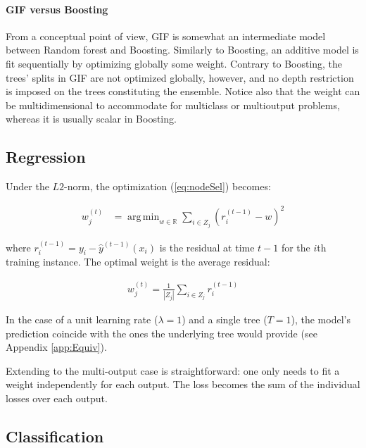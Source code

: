 \documentclass{article}
\DeclareMathOperator*{\argmin}{arg\,min}
\begin{document}
\paragraph{GIF versus Boosting}
From a conceptual point of view, GIF is somewhat an intermediate model 
between Random forest and Boosting. Similarly to Boosting, an additive model 
is fit sequentially by optimizing globally some weight. Contrary to 
Boosting, the trees' splits in GIF are not optimized globally, however, and no 
depth restriction is imposed on the trees constituting the ensemble. Notice 
also that the weight can be multidimensional to accommodate for multiclass or 
multioutput problems, whereas it is usually scalar in Boosting.


\subsection{Regression}
\label{subsec:regression}

Under the $L2$-norm, the optimization (\ref{eq:nodeSel}) becomes:

\vspace*{-\baselineskip}
\begin{align}\label{eq:L2min}
w_j^{(t)} &=  \argmin_{w \in \mathbb{R}} \sum_{i \in Z_j} \left(r_i^{(t-1)} - 
w\right)^2
\end{align}
\vspace*{-\baselineskip}

where $r_i^{(t-1)} = y_i - \hat{y}^{(t-1)}(x_i)$ is the residual at time $t-1$ 
for the $i$th training instance.
The optimal weight is the average residual:

\vspace*{-\baselineskip}
\begin{align}\label{eq:L2Solution}
w_j^{(t)} = \frac{1}{|Z_j|} \sum_{i \in Z_j} r_i^{(t-1)}
\end{align}
\vspace*{-\baselineskip}

In the case of a unit learning rate ($\lambda = 1$) and a single tree ($T=1$), 
the model's prediction coincide with the ones the underlying tree would provide 
(see Appendix \ref{app:Equiv}).

Extending to the multi-output case is straightforward: one only needs to fit a 
weight independently for each output. The loss becomes the sum of the 
individual losses over each output.

\subsection{Classification}
\label{subsec:classification}
\end{document}
